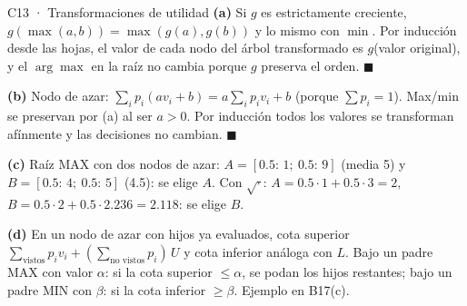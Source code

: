 \begin{solucion}{C13 · Transformaciones de utilidad}
\textbf{(a)} Si $g$ es estrictamente creciente, $g(\max(a,b))=\max(g(a),g(b))$ y lo mismo con $\min$. Por
inducción desde las hojas, el valor de cada nodo del árbol transformado es $g$(valor original), y el
$\arg\max$ en la raíz no cambia porque $g$ preserva el orden. $\blacksquare$

\textbf{(b)} Nodo de azar: $\sum_ip_i(av_i+b)=a\sum_ip_iv_i+b$ (porque $\sum p_i=1$). Max/min se preservan
por (a) al ser $a>0$. Por inducción todos los valores se transforman afínmente y las decisiones no cambian. $\blacksquare$

\textbf{(c)} Raíz MAX con dos nodos de azar: $A=[0.5{:}\,1;\ 0.5{:}\,9]$ (media 5) y $B=[0.5{:}\,4;\ 0.5{:}\,5]$
(4.5): se elige $A$. Con $\sqrt{\cdot}$: $A=0.5\cdot1+0.5\cdot3=2$, $B=0.5\cdot2+0.5\cdot2.236=2.118$: se elige $B$.

\textbf{(d)} En un nodo de azar con hijos ya evaluados, cota superior
$\sum_{\text{vistos}}p_iv_i+(\sum_{\text{no vistos}}p_i)\,U$ y cota inferior análoga con $L$. Bajo un padre MAX con
valor $\alpha$: si la cota superior $\le\alpha$, se podan los hijos restantes; bajo un padre MIN con $\beta$: si la
cota inferior $\ge\beta$. Ejemplo en B17(c).
\end{solucion}


